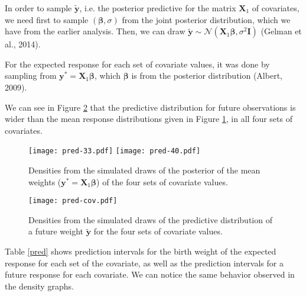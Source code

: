 \documentclass[a4paper, 11pt]{article}
\begin{document}
In order to sample $\tilde{\textbf{y}}$, i.e. the posterior predictive for the matrix $\textbf{X}_1$ of covariates, we need first to sample $(\boldsymbol{\beta}, \sigma)$ from the joint posterior distribution, which we have from the earlier analysis. Then, we can draw $\tilde{\textbf{y}} \sim \mathcal{N}(\textbf{X}_1\boldsymbol{\beta}, \sigma^2\textbf{I})$ (Gelman et al., 2014).

For the expected response for each set of covariate values, it was done by sampling from $\textbf{y}^* = \textbf{X}_1\boldsymbol{\beta}$, which $\boldsymbol{\beta}$ is from the posterior distribution (Albert, 2009).

We can see in Figure \ref{y19pred} that the predictive distribution for future observations is wider than the mean response distributions given in Figure \ref{y19exp}, in all four sets of covariates.

\begin{figure}[H]
\centering
\texttt{[image: pred-33.pdf]}    
\texttt{[image: pred-40.pdf]}    
\caption{Densities from the simulated draws of the posterior of the mean weights ($\textbf{y}^* = \textbf{X}_1\boldsymbol{\beta}$) of the four sets of covariate values.}
\label{y19exp}
\end{figure}

\begin{figure}[H]
\centering
\texttt{[image: pred-cov.pdf]}     
\caption{Densities from the simulated draws of the predictive distribution of a future weight $\tilde{\textbf{y}}$ for the four sets of covariate values.}
\label{y19pred}
\end{figure}

Table \ref{pred} shows prediction intervals for the birth weight of the expected response for each set of the covariate, as well as the prediction intervals for a future response for each covariate. We can notice the same behavior observed in the density graphs.
\end{document}

